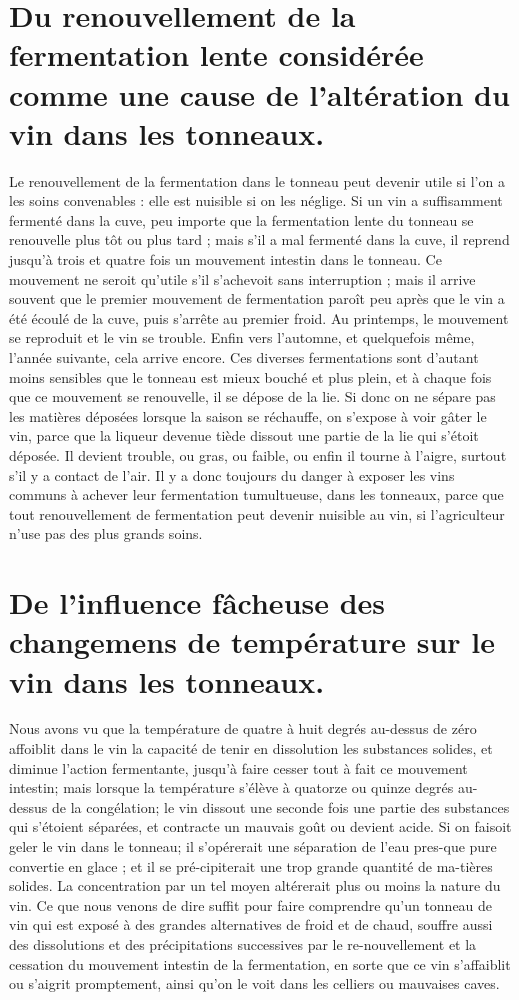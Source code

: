 \section{Du renouvellement de la fermentation lente considérée comme une cause de l'altération du vin dans les tonneaux.}
Le renouvellement de la fermentation dans le tonneau peut devenir utile si l'on a les soins convenables : elle est nuisible si on les néglige.
Si un vin a suffisamment fermenté dans la cuve, peu importe que la fermentation lente du tonneau se renouvelle plus tôt ou plus tard ; mais s'il a mal fermenté dans la cuve, il reprend jusqu'à trois et quatre fois un mouvement intestin dans le tonneau.
Ce mouvement ne seroit qu'utile s'il s'achevoit sans interruption ; mais il arrive souvent que le premier mouvement de fermentation paroît peu après que le vin a été écoulé de la cuve, puis s'arrête au premier froid. Au printemps, le mouvement se reproduit et le vin se trouble. Enfin vers l'automne, et quelquefois même, l'année suivante, cela arrive encore. Ces diverses fermentations sont d'autant moins sensibles que le tonneau est mieux bouché et plus plein,\setcounter{page}{326} et à chaque fois que ce mouvement se renouvelle, il se dépose de la lie. Si donc on ne sépare pas les matières déposées lorsque la saison se réchauffe, on s'expose à voir gâter le vin, parce que la liqueur devenue tiède dissout une partie de la lie qui s'étoit déposée. Il devient trouble, ou gras, ou faible, ou enfin il tourne à l'aigre, surtout s'il y a contact de l'air.
Il y a donc toujours du danger à exposer les vins communs à achever leur fermentation tumultueuse, dans les tonneaux, parce que tout renouvellement de fermentation peut devenir nuisible au vin, si l'agriculteur n'use pas des plus grands soins.
\section{De l'influence fâcheuse des changemens de température sur le vin dans les tonneaux.}
Nous avons vu que la température de quatre à huit degrés au-dessus de zéro affoiblit dans le vin la capacité de tenir en dissolution les substances solides, et diminue l'action fermentante, jusqu'à faire cesser tout à fait ce mouvement intestin; mais lorsque la température s'élève à quatorze ou quinze degrés au-dessus de la congélation; le vin dissout une seconde fois une partie des substances qui s'étoient séparées, et contracte un mauvais goût ou devient acide.
Si on faisoit geler le vin dans le tonneau;\setcounter{page}{327} il s'opérerait une séparation de l'eau pres-que pure convertie en glace ; et il se pré-cipiterait une trop grande quantité de ma-tières solides. La concentration par un tel moyen altérerait plus ou moins la nature du vin.
Ce que nous venons de dire suffit pour faire comprendre qu'un tonneau de vin qui est exposé à des grandes alternatives de froid et de chaud, souffre aussi des dissolutions et des précipitations successives par le re-nouvellement et la cessation du mouvement intestin de la fermentation, en sorte que ce vin s'affaiblit ou s'aigrit promptement, ainsi qu'on le voit dans les celliers ou mauvaises caves.
